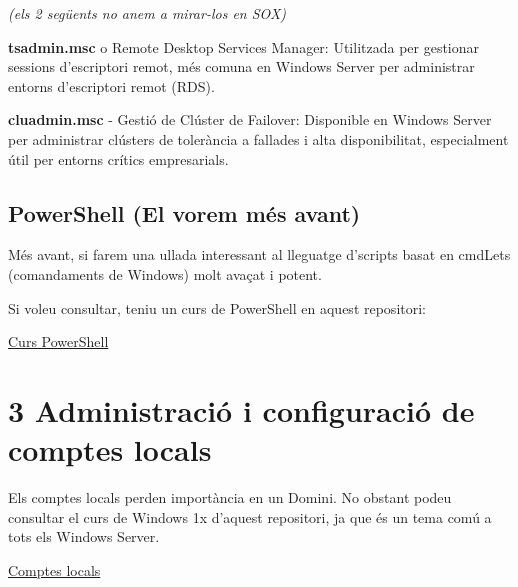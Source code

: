 \documentclass[
  a4paper,
]{article}
\begin{document}
\emph{(els 2 següents no anem a mirar-los en SOX)}

\textbf{tsadmin.msc} o Remote Desktop Services Manager: Utilitzada per
gestionar sessions d'escriptori remot, més comuna en Windows Server per
administrar entorns d'escriptori remot (RDS).

\textbf{cluadmin.msc} - Gestió de Clúster de Failover: Disponible en
Windows Server per administrar clústers de tolerància a fallades i alta
disponibilitat, especialment útil per entorns crítics empresarials.

\subsection{PowerShell (El vorem més
avant)}\label{powershell-el-vorem-muxe9s-avant}

Més avant, si farem una ullada interessant al lleguatge d'scripts basat
en cmdLets (comandaments de Windows) molt avaçat i potent.

Si voleu consultar, teniu un curs de PowerShell en aquest repositori:

\href{https://github.com/tofermos/PowerShell}{Curs PowerShell}

\section{3 Administració i configuració de comptes
locals}\label{administraciuxf3-i-configuraciuxf3-de-comptes-locals}

Els comptes locals perden importància en un Domini. No obstant podeu
consultar el curs de Windows 1x d'aquest repositori, ja que és un tema
comú a tots els Windows Server.

\href{https://tofermos.github.io/Windows11/gestions/comptesLocals.html}{Comptes
locals}
\end{document}
